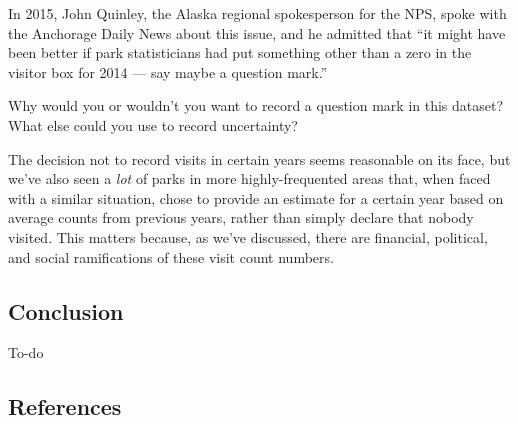 \documentclass[
  letterpaper,
  DIV=11,
  numbers=noendperiod]{scrartcl}
\begin{document}
In 2015, John Quinley, the Alaska regional spokesperson for the NPS,
spoke with the Anchorage Daily News about this issue, and he admitted
that ``it might have been better if park statisticians had put something
other than a zero in the visitor box for 2014 --- say maybe a question
mark.''

\begin{tcolorbox}[enhanced jigsaw, colframe=quarto-callout-tip-color-frame, titlerule=0mm, breakable, toprule=.15mm, opacitybacktitle=0.6, left=2mm, colback=white, bottomrule=.15mm, arc=.35mm, colbacktitle=quarto-callout-tip-color!10!white, bottomtitle=1mm, toptitle=1mm, title=\textcolor{quarto-callout-tip-color}{\faLightbulb}\hspace{0.5em}{Discussion}, coltitle=black, rightrule=.15mm, opacityback=0, leftrule=.75mm]

Why would you or wouldn't you want to record a question mark in this
dataset? What else could you use to record uncertainty?

\end{tcolorbox}

The decision not to record visits in certain years seems reasonable on
its face, but we've also seen a \emph{lot} of parks in more
highly-frequented areas that, when faced with a similar situation, chose
to provide an estimate for a certain year based on average counts from
previous years, rather than simply declare that nobody visited. This
matters because, as we've discussed, there are financial, political, and
social ramifications of these visit count numbers.

\subsection{Conclusion}\label{conclusion}

To-do

\subsection{References}\label{references}
\end{document}
